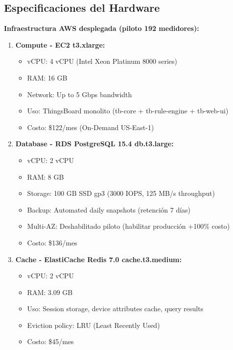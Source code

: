 \subsection{Especificaciones del Hardware}
\label{sec:server-hardware}

\textbf{Infraestructura AWS desplegada (piloto 192 medidores):}

\begin{enumerate}
    \item \textbf{Compute - EC2 t3.xlarge:}
    \begin{itemize}
        \item vCPU: 4 vCPU (Intel Xeon Platinum 8000 series)
        \item RAM: 16 GB
        \item Network: Up to 5 Gbps bandwidth
        \item Uso: ThingsBoard monolito (tb-core + tb-rule-engine + tb-web-ui)
        \item Costo: \$122/mes (On-Demand US-East-1)
    \end{itemize}
    
    \item \textbf{Database - RDS PostgreSQL 15.4 db.t3.large:}
    \begin{itemize}
        \item vCPU: 2 vCPU
        \item RAM: 8 GB
        \item Storage: 100 GB SSD gp3 (3000 IOPS, 125 MB/s throughput)
        \item Backup: Automated daily snapshots (retención 7 días)
        \item Multi-AZ: Deshabilitado piloto (habilitar producción +100\% costo)
        \item Costo: \$136/mes
    \end{itemize}
    
    \item \textbf{Cache - ElastiCache Redis 7.0 cache.t3.medium:}
    \begin{itemize}
        \item vCPU: 2 vCPU
        \item RAM: 3.09 GB
        \item Uso: Session storage, device attributes cache, query results
        \item Eviction policy: LRU (Least Recently Used)
        \item Costo: \$45/mes
    \end{itemize}
    

\end{enumerate}
